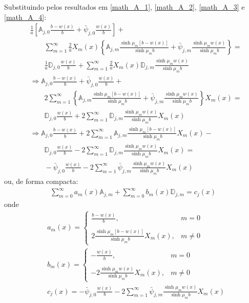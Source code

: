 Substituindo pelos resultados em \eqref{math_A_1}, \eqref{math_A_2}, \eqref{math_A_3} e \eqref{math_A_4}:
\begin{align}
& \frac{1}{a}\left[\mathbb{A}_{j,0}\frac{b - w(x)}{b} + \bar{\psi}_{j,0}\frac{w(x)}{b}\right] + \nonumber \\
& \quad\quad
\sum_{m=1}^\infty \frac{2}{a}X_m(x)\left\lbrace\mathbb{A}_{j,m}\frac{\sinh\mu_m [b - w(x)]}{\sinh\mu_m b} + \bar{\psi}_{j, m}\frac{\sinh\mu_m w(x)}{\sinh\mu_m b}\right\rbrace
= \nonumber \\
& \quad\quad \frac{1}{a}\mathbb{D}_{j,0}\frac{w(x)}{b} + 
\sum_{m=1}^\infty \frac{2}{a}X_m(x)\mathbb{D}_{j,m}\frac{\sinh\mu_m w(x)}{\sinh\mu_m b} \nonumber \\
& \Rightarrow \mathbb{A}_{j,0}\frac{b - w(x)}{b} + \bar{\psi}_{j,0}\frac{w(x)}{b} + \nonumber \\
& \quad\quad
2 \sum_{m=1}^\infty \left\lbrace\mathbb{A}_{j,m}\frac{\sinh\mu_m [b - w(x)]}{\sinh\mu_m b} + \bar{\psi}_{j, m}\frac{\sinh\mu_m w(x)}{\sinh\mu_m b}\right\rbrace X_m(x)
= \nonumber \\
& \quad\quad \mathbb{D}_{j,0}\frac{w(x)}{b} +  
2 \sum_{m=1}^\infty \mathbb{D}_{j,m}\frac{\sinh\mu_m w(x)}{\sinh\mu_m b}X_m(x) \nonumber \\
& \Rightarrow \mathbb{A}_{j,0}\frac{b - w(x)}{b} + 
2 \sum_{m=1}^\infty \mathbb{A}_{j,m}\frac{\sinh\mu_m [b - w(x)]}{\sinh\mu_m b}X_m(x) - \nonumber \\
& \quad\quad   \mathbb{D}_{j,0}\frac{w(x)}{b} - 2 \sum_{m=1}^\infty \mathbb{D}_{j,m}\frac{\sinh\mu_m w(x)}{\sinh\mu_m b}X_m(x)
= \nonumber \\
& \quad\quad  
-
\bar{\psi}_{j,0}\frac{w(x)}{b}
-
2 \sum_{m=1}^\infty \bar{\psi}_{j, m}\frac{\sinh\mu_m w(x)}{\sinh\mu_m b}X_m(x)
\end{align}
ou, de forma compacta:
\begin{align}
\sum_{m = 0}^\infty a_m(x) \mathbb{A}_{j,m} + \sum_{m = 0}^\infty b_m(x) \mathbb{D}_{j,m} = c_{j}(x) \label{compacta_1}
\end{align}
onde
\begin{align}
& a_m(x) = \left\lbrace
\begin{array}{ll}
\displaystyle \frac{b - w(x)}{b}, & m = 0 \\ \\
\displaystyle 2 \frac{\sinh\mu_m [b - w(x)]}{\sinh\mu_m b}X_m(x) , & m \ne 0
\end{array}
\right. \\
& b_m(x) = \left\lbrace
\begin{array}{ll}
\displaystyle -\frac{w(x)}{b}, & m = 0 \\ \\
\displaystyle - 2 \frac{\sinh\mu_m w(x)}{\sinh\mu_m b} X_m(x), & m \ne 0
\end{array}
\right. \\
& c_{j}(x) = -
\bar{\psi}_{j,0}\frac{w(x)}{b}
-
2 \sum_{m=1}^\infty \bar{\psi}_{j, m}\frac{\sinh\mu_m w(x)}{\sinh\mu_m b}X_m(x)
\end{align}

